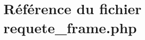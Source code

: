 \hypertarget{requete__frame_8php}{
\section{R\'{e}f\'{e}rence du fichier requete\_\-frame.php}
\label{requete__frame_8php}
}
